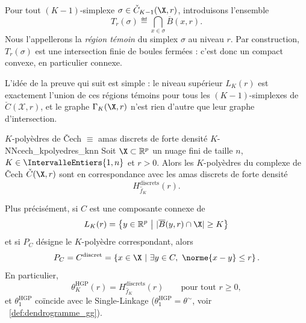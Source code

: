 Pour tout $(K-1)$-simplexe $\sigma\in \check C_{K-1}(\X,r)$, introduisons l'ensemble
\[
    T_r(\sigma) \eqdef \bigcap_{x\in \sigma} \overline B(x,r).
\]
Nous l'appellerons la \emph{région témoin} du simplex $\sigma$ au niveau $r$. Par construction, $T_r(\sigma)$ est une intersection finie de boules fermées : c'est donc un compact convexe, en particulier connexe.

L'idée de la preuve qui suit est simple : le niveau supérieur $L_K(r)$ est exactement l'union de ces régions témoins pour tous les $(K-1)$-simplexes de $\check C(\mathcal X, r)$, et le graphe $\Gamma_K(\X,r)$ n'est rien d'autre que leur graphe d'intersection.

\begin{Theoreme}{$K$-polyèdres de \v Cech $\equiv$ amas discrets de forte densité $K$-NN}{cech_kpolyedres_knn}
Soit $\X\subset \mathbb R^p$ un nuage fini de taille $n$, $K\in \IntervalleEntiers{1,n}$ et $r>0$. Alors les $K$-polyèdres du complexe de \v Cech $\check C(\X,r)$ sont en correspondance avec les amas discrets de forte densité
\[
    H^{\mathrm{discrets}}_{\widehat f_K}(r).
\]

Plus précisément, si $C$ est une composante connexe de
\[
    L_K(r)=\left\{ y\in\mathbb R^p \ \middle|\ |\overline B(y,r)\cap \X|\ge K \right\}
\]
et si $P_C$ désigne le $K$-polyèdre correspondant, alors
\[
    P_C = C^{\mathrm{discret}} = \left\{ x\in \X \ \middle|\ \exists y\in C,\ \norme{x-y}\le r \right\}.
\]
En particulier,
\[
    \theta^{\mathrm{HGP}}_K(r) = H^{\mathrm{discrets}}_{\widehat f_K}(r)
    \qquad\text{pour tout } r\ge 0,
\]
et $\theta^{\mathrm{HGP}}_1 $ coïncide avec le Single-Linkage ($\theta^{\mathrm{HGP}}_1 = \theta^\sim$, voir \Def~\ref{def:dendrogramme_gg}).
\end{Theoreme}

